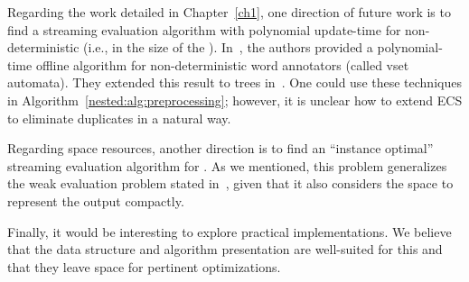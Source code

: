 
Regarding the work detailed in Chapter~\ref{ch1}, one direction of future work is to find a streaming evaluation algorithm with polynomial update-time for non-deterministic \vpann (i.e., in the size of the \vpann). In~\cite{AmarilliBMN19}, the authors provided a polynomial-time offline algorithm for non-deterministic word annotators (called vset automata). 
They extended this result to trees in~\cite{AmarilliBMN19pods}. One could use these techniques in Algorithm~\ref{nested:alg:preprocessing}; however, it is unclear how to extend ECS to eliminate duplicates in a natural way. 

Regarding space resources, another direction is to find an ``instance optimal'' streaming evaluation algorithm for \vpann. 
As we mentioned, this problem generalizes the weak evaluation problem stated in~\cite{SegoufinV02}, given that it also considers the space to represent the output compactly. 

Finally, it would be interesting to explore practical implementations. 
We believe that the data structure and algorithm presentation are well-suited for this and that they leave space for pertinent optimizations.


